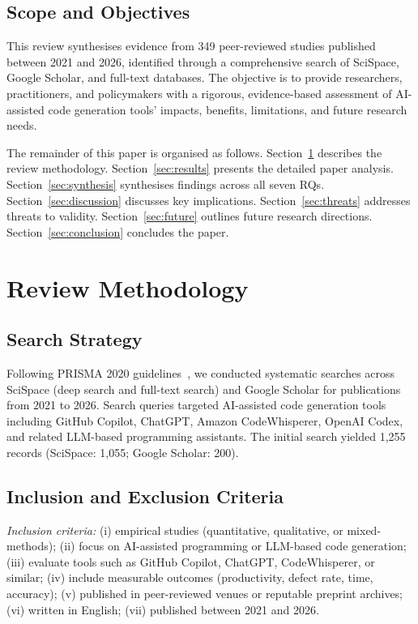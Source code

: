 \documentclass[journal,twoside,10pt]{IEEEtran}
\begin{document}
\subsection{Scope and Objectives}

This review synthesises evidence from 349 peer-reviewed studies published
between 2021 and 2026, identified through a comprehensive search of SciSpace,
Google Scholar, and full-text databases. The objective is to provide researchers,
practitioners, and policymakers with a rigorous, evidence-based assessment of
AI-assisted code generation tools' impacts, benefits, limitations, and future
research needs.

The remainder of this paper is organised as follows.
Section~\ref{sec:methods} describes the review methodology.
Section~\ref{sec:results} presents the detailed paper analysis.
Section~\ref{sec:synthesis} synthesises findings across all seven RQs.
Section~\ref{sec:discussion} discusses key implications.
Section~\ref{sec:threats} addresses threats to validity.
Section~\ref{sec:future} outlines future research directions.
Section~\ref{sec:conclusion} concludes the paper.

\section{Review Methodology}
\label{sec:methods}

\subsection{Search Strategy}

Following PRISMA 2020 guidelines~\cite{page2021prisma}, we conducted systematic
searches across SciSpace (deep search and full-text search) and Google Scholar
for publications from 2021 to 2026. Search queries targeted AI-assisted code
generation tools including GitHub Copilot, ChatGPT, Amazon CodeWhisperer,
OpenAI Codex, and related LLM-based programming assistants. The initial search
yielded 1,255 records (SciSpace: 1,055; Google Scholar: 200).

\subsection{Inclusion and Exclusion Criteria}

\textit{Inclusion criteria:} (i) empirical studies (quantitative, qualitative,
or mixed-methods); (ii) focus on AI-assisted programming or LLM-based code
generation; (iii) evaluate tools such as GitHub Copilot, ChatGPT, CodeWhisperer,
or similar; (iv) include measurable outcomes (productivity, defect rate, time,
accuracy); (v) published in peer-reviewed venues or reputable preprint archives;
(vi) written in English; (vii) published between 2021 and 2026.
\end{document}
